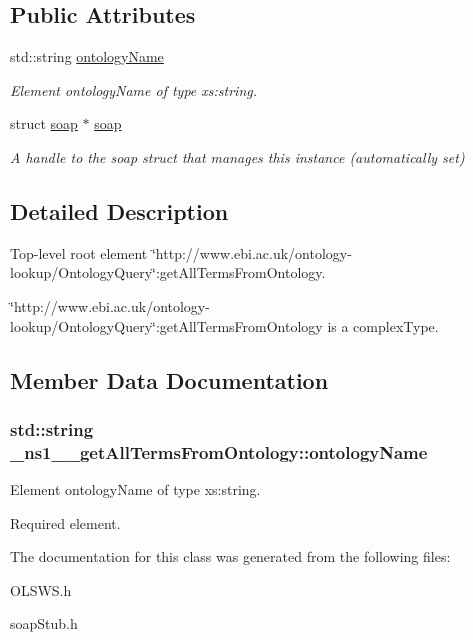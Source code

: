 \subsection*{Public Attributes}
\begin{DoxyCompactItemize}
\item 
std::string \hyperlink{class__ns1____getAllTermsFromOntology_a25c46c840a3ca9285c72da8acb7f632c}{ontologyName}
\begin{DoxyCompactList}\small\item\em Element ontologyName of type xs:string. \end{DoxyCompactList}\item 
\hypertarget{class__ns1____getAllTermsFromOntology_a2a2636afdd459a30bface92d3f40c6e3}{
struct \hyperlink{class__ns1____getAllTermsFromOntology_a2a2636afdd459a30bface92d3f40c6e3}{soap} $\ast$ \hyperlink{class__ns1____getAllTermsFromOntology_a2a2636afdd459a30bface92d3f40c6e3}{soap}}
\label{class__ns1____getAllTermsFromOntology_a2a2636afdd459a30bface92d3f40c6e3}

\begin{DoxyCompactList}\small\item\em A handle to the soap struct that manages this instance (automatically set) \end{DoxyCompactList}\end{DoxyCompactItemize}


\subsection{Detailed Description}
Top-\/level root element \char`\"{}http://www.ebi.ac.uk/ontology-\/lookup/OntologyQuery\char`\"{}:getAllTermsFromOntology. 

\char`\"{}http://www.ebi.ac.uk/ontology-\/lookup/OntologyQuery\char`\"{}:getAllTermsFromOntology is a complexType. 

\subsection{Member Data Documentation}
\hypertarget{class__ns1____getAllTermsFromOntology_a25c46c840a3ca9285c72da8acb7f632c}{
\subsubsection[{ontologyName}]{\setlength{\rightskip}{0pt plus 5cm}std::string {\bf \_\-ns1\_\-\_\-getAllTermsFromOntology::ontologyName}}}
\label{class__ns1____getAllTermsFromOntology_a25c46c840a3ca9285c72da8acb7f632c}


Element ontologyName of type xs:string. 

Required element. 

The documentation for this class was generated from the following files:\begin{DoxyCompactItemize}
\item 
OLSWS.h\item 
soapStub.h\end{DoxyCompactItemize}
